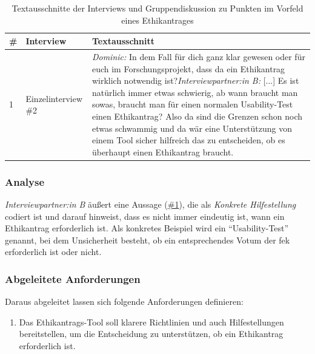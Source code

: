 \documentclass[a4paper,12pt,twoside]{scrreprt}
\begin{document}
\begin{table}[ht]
    \centering
    \begin{tabular}{p{.05\linewidth} | p{.2\linewidth} | p{.65\linewidth}}
        \# & \textbf{Interview} & \textbf{Textausschnitt}\\
        \hline
        1 & Einzelinterview \#2 & \textit{Dominic:} In dem Fall für dich ganz klar gewesen oder für euch im Forschungsprojekt, dass da ein Ethikantrag wirklich notwendig ist?\newline \textit{Interviewpartner:in B:} [...] Es ist natürlich immer etwas schwierig, ab wann braucht man sowas, braucht man für einen normalen Usability-Test einen Ethikantrag? Also da sind die Grenzen schon noch etwas schwammig und da wär eine Unterstützung von einem Tool sicher hilfreich das zu entscheiden, ob es überhaupt einen Ethikantrag braucht.
    \end{tabular}
    \caption{Textausschnitte der Interviews und Gruppendiskussion zu Punkten im Vorfeld eines Ethikantrages}
    \label{tab:anforderungen-vorfeld-antrag}
\end{table}

\subsubsection*{Analyse}
\label{sub-sub-sec:analyse-vorfeld-antrag}

\textit{Interviewpartner:in B} äußert eine Aussage (\hyperref[tab:anforderungen-vorfeld-antrag]{\#1}), die als \textit{Konkrete Hilfestellung} codiert ist und darauf hinweist, dass es nicht immer eindeutig ist, wann ein Ethikantrag erforderlich ist. Als konkretes Beispiel wird ein \enquote{Usability-Test} genannt, bei dem Unsicherheit besteht, ob ein entsprechendes Votum der \ac{fek} erforderlich ist oder nicht.

\subsubsection*{Abgeleitete Anforderungen}
\label{sub-sub-sec:abgeleitete-anforderungen-vorfeld-antrag}

Daraus abgeleitet lassen sich folgende Anforderungen definieren:
\begin{enumerate}[label=\textbf{\#\arabic*}]
    \item Das Ethikantrags-Tool soll klarere Richtlinien und auch Hilfestellungen bereitstellen, um die Entscheidung zu unterstützen, ob ein Ethikantrag erforderlich ist.
\end{enumerate}
\end{document}
